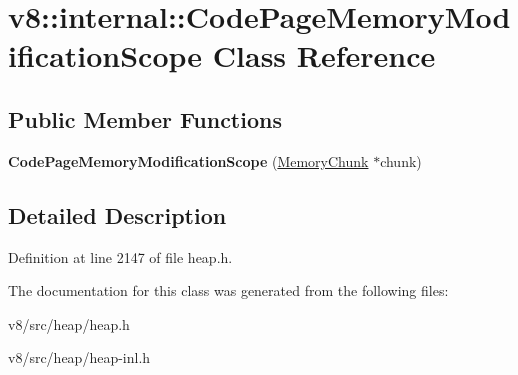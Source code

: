 \hypertarget{classv8_1_1internal_1_1CodePageMemoryModificationScope}{}\section{v8\+:\+:internal\+:\+:Code\+Page\+Memory\+Modification\+Scope Class Reference}
\label{classv8_1_1internal_1_1CodePageMemoryModificationScope}
\subsection*{Public Member Functions}
\begin{DoxyCompactItemize}
\item 
\mbox{\label{classv8_1_1internal_1_1CodePageMemoryModificationScope_a0691ccdda06e53eb62e4fe151d09af90}} 
{\bfseries Code\+Page\+Memory\+Modification\+Scope} (\mbox{\hyperlink{classv8_1_1internal_1_1MemoryChunk}{Memory\+Chunk}} $\ast$chunk)
\end{DoxyCompactItemize}


\subsection{Detailed Description}


Definition at line 2147 of file heap.\+h.



The documentation for this class was generated from the following files\+:\begin{DoxyCompactItemize}
\item 
v8/src/heap/heap.\+h\item 
v8/src/heap/heap-\/inl.\+h\end{DoxyCompactItemize}
